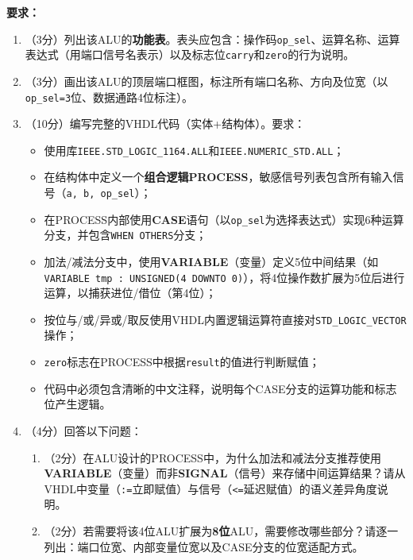 \textbf{要求：}
\begin{enumerate}[label=(\arabic*)]
  \item （3分）列出该ALU的\textbf{功能表}。表头应包含：操作码\texttt{op\_sel}、运算名称、运算表达式（用端口信号名表示）以及标志位\texttt{carry}和\texttt{zero}的行为说明。

  \item （3分）画出该ALU的顶层端口框图，标注所有端口名称、方向及位宽（以\texttt{op\_sel=3}位、数据通路4位标注）。

  \item （10分）编写完整的VHDL代码（实体+结构体）。要求：
  \begin{itemize}
    \item 使用库\texttt{IEEE.STD\_LOGIC\_1164.ALL}和\texttt{IEEE.NUMERIC\_STD.ALL}；
    \item 在结构体中定义一个\textbf{组合逻辑PROCESS}，敏感信号列表包含所有输入信号（\texttt{a, b, op\_sel}）；
    \item 在PROCESS内部使用\textbf{CASE}语句（以\texttt{op\_sel}为选择表达式）实现6种运算分支，并包含\texttt{WHEN OTHERS}分支；
    \item 加法/减法分支中，使用\textbf{VARIABLE}（变量）定义5位中间结果（如\texttt{VARIABLE tmp : UNSIGNED(4 DOWNTO 0)}），将4位操作数扩展为5位后进行运算，以捕获进位/借位（第4位）；
    \item 按位与/或/异或/取反使用VHDL内置逻辑运算符直接对\texttt{STD\_LOGIC\_VECTOR}操作；
    \item \texttt{zero}标志在PROCESS中根据\texttt{result}的值进行判断赋值；
    \item 代码中必须包含清晰的中文注释，说明每个CASE分支的运算功能和标志位产生逻辑。
  \end{itemize}

  \item （4分）回答以下问题：
  \begin{enumerate}
    \item （2分）在ALU设计的PROCESS中，为什么加法和减法分支推荐使用\textbf{VARIABLE}（变量）而非\textbf{SIGNAL}（信号）来存储中间运算结果？请从VHDL中变量（\texttt{:=}立即赋值）与信号（\texttt{<=}延迟赋值）的语义差异角度说明。
    \item （2分）若需要将该4位ALU扩展为\textbf{8位}ALU，需要修改哪些部分？请逐一列出：端口位宽、内部变量位宽以及CASE分支的位宽适配方式。
  \end{enumerate}
\end{enumerate}


